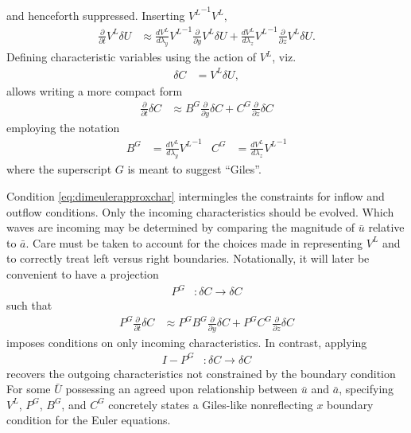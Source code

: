 \documentclass[letterpaper,11pt,nointlimits,reqno,draft]{amsbook}
\begin{document}
and henceforth suppressed.  Inserting ${V^L}^{-1} V^L$,
\begin{align}
  \frac{\partial}{\partial{}t}
  V^L
  \delta{}U
  &\approx
  \frac{dV^L}{d\lambda_y}
  {V^L}^{-1}
  \frac{\partial}{\partial{}y}
  V^L
  \delta{}U
  +
  \frac{dV^L}{d\lambda_z}
  {V^L}^{-1}
  \frac{\partial}{\partial{}z}
  V^L
  \delta{}U
.
\end{align}
Defining characteristic variables using the action of $V^L$, viz.
\begin{align}
  \delta{}C &= V^L \delta{}U
  ,
\end{align}
allows writing a more compact form
\begin{align}
  \frac{\partial}{\partial{}t}
  \delta{}C
  &\approx
  B^G
  \frac{\partial}{\partial{}y}
  \delta{}C
  +
  C^G
  \frac{\partial}{\partial{}z}
  \delta{}C
\end{align}
employing the notation
\begin{align}
  B^G
&=
  \frac{dV^L}{d\lambda_y}
  {V^L}^{-1}
&
  C^G
&=
  \frac{dV^L}{d\lambda_z}
  {V^L}^{-1}
\end{align}
where the superscript $G$ is meant to suggest ``Giles''.

Condition \eqref{eq:dimeulerapproxchar} intermingles the constraints for
inflow and outflow conditions.  Only the incoming characteristics should be
evolved.  Which waves are incoming may be determined by comparing the magnitude
of $\bar{u}$ relative to $\bar{a}$.  Care must be taken to account for the
choices made in representing $V^L$ and to correctly treat left versus right
boundaries.  Notationally, it will later be convenient to have a
projection
\begin{align}
\label{eq:PG}
  P^G
  &:
  \delta{C} \to \delta{C}
\end{align}
such that
\begin{align}
\label{eq:dimeulerapproxchar}
  P^G
  \frac{\partial}{\partial{}t}
  \delta{}C
  &\approx
  P^G B^G
  \frac{\partial}{\partial{}y}
  \delta{}C
  +
  P^G C^G
  \frac{\partial}{\partial{}z}
  \delta{}C
\end{align}
imposes conditions on only incoming characteristics.  In contrast, applying
\begin{align}
 I - P^G
 &:
 \delta{C} \to \delta{C}
\end{align}
recovers the outgoing characteristics not constrained by the boundary condition
For some $\bar{U}$ possessing an agreed upon relationship between $\bar{u}$ and
$\bar{a}$, specifying $V^L$, $P^G$, $B^G$, and $C^G$ concretely states a
Giles-like nonreflecting $x$ boundary condition for the Euler equations.
\end{document}
